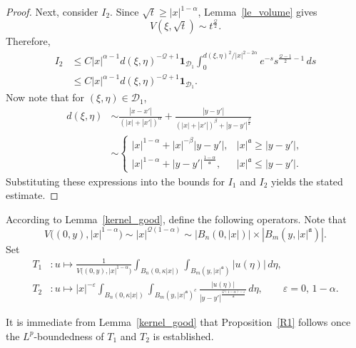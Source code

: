 \documentclass[12pt]{amsart}
\begin{document}
\begin{proof}
Next, consider $I_2$. Since $\sqrt{t}\ge |x|^{1-\alpha}$, Lemma~\ref{le_volume} gives
\begin{equation*}
    V(\xi,\sqrt{t}) \sim t^{\frac{\mathcal{Q}}{2}}.
\end{equation*}
Therefore,
\begin{align*}
    I_2
    &\le C |x|^{\alpha-1} d(\xi,\eta)^{-\mathcal{Q}+1} \mathbf{1}_{\mathcal{D}_1} \int_0^{d(\xi,\eta)^2/|x|^{2-2\alpha}} e^{-s} s^{\frac{\mathcal{Q}-1}{2}-1} \, ds\\
    &\le C |x|^{\alpha-1} d(\xi,\eta)^{-\mathcal{Q}+1} \mathbf{1}_{\mathcal{D}_1}.
\end{align*}
Now note that for $(\xi,\eta)\in \mathcal{D}_1$,
\begin{align*}
    d(\xi,\eta)
    &\sim \frac{|x-x'|}{(|x|+|x'|)^\alpha} + \frac{|y-y'|}{(|x|+|x'|)^\beta + |y-y'|^{\frac{\beta}{\mathfrak a}}}\\
    &\sim \begin{cases}
        |x|^{1-\alpha} + |x|^{-\beta} |y-y'|, & |x|^{\mathfrak a} \ge |y-y'|,\\[4pt]
        |x|^{1-\alpha} + |y-y'|^{\frac{1-\alpha}{\mathfrak a}}, & |x|^{\mathfrak a} \le |y-y'|.
    \end{cases}
\end{align*}
Substituting these expressions into the bounds for $I_1$ and $I_2$ yields the stated estimate.
\end{proof}

According to Lemma~\ref{kernel_good}, define the following operators. Note that
\begin{equation*}
    V\bigl((0,y), |x|^{1-\alpha}\bigr) \sim |x|^{\mathcal{Q}(1-\alpha)} \sim |B_n(0,|x|)| \times |B_m(y,|x|^{\mathfrak a})|.
\end{equation*}
Set
\begin{align}\label{def_T1}
    T_1&: u \mapsto \frac{1}{V\bigl( (0,y), |x|^{1-\alpha} \bigr)} \int_{B_n(0,\kappa|x|)} \int_{B_m(y,|x|^{\mathfrak a})} |u(\eta)| \, d\eta,\\[4pt]
    \label{def_T2}
    T_2&: u \mapsto |x|^{-\varepsilon} \int_{B_n(0,\kappa|x|)} \int_{B_m(y, |x|^{\mathfrak a})^c} \frac{|u(\eta)|}{|y-y'|^{\frac{\mathcal{Q}(1-\alpha)-\varepsilon}{\mathfrak a}}} \, d\eta, \qquad \varepsilon = 0,\, 1-\alpha.
\end{align}

It is immediate from Lemma~\ref{kernel_good} that Proposition~\ref{R1} follows once the $L^p$-boundedness of $T_1$ and $T_2$ is established.
\end{document}
